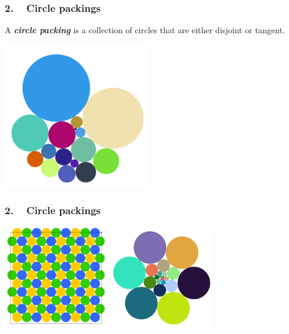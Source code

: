 
\begin{frame}
\frametitle{2. ~ Circle packings}

A \emph{\bfseries circle packing} is a collection of circles that are either disjoint or tangent.


\begin{center}
 \includegraphics[width=180pt]{CP1.png}
\end{center}



\end{frame}




\begin{frame}
\frametitle{2. ~ Circle packings}


\begin{center}
\includegraphics[width=130pt]{CP5.png} \hspace{30pt}
\includegraphics[width=130pt]{CP7.png}
\end{center}

\end{frame}






